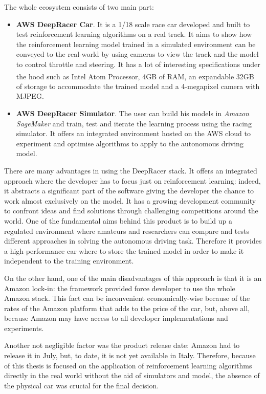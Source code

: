 The whole ecosystem consists of two main part:
\begin{itemize}
	\item \textbf{AWS DeepRacer Car}. It is a 1/18 scale race car developed and built to test reinforcement learning algorithms on a real track. It aims to show how the reinforcement learning model trained in a simulated environment can be conveyed to the real-world by using cameras to view the track and the model to control throttle and steering. It has a lot of interesting specifications under the hood such as Intel Atom \textsuperscript{\textregistered} Processor, 4GB of RAM, an expandable 32GB of storage to accommodate the trained model and a 4-megapixel camera with MJPEG.
	\item \textbf{AWS DeepRacer Simulator}. The user can build his models in \textit{Amazon SageMaker} and train, test and iterate the learning process using the racing simulator. It offers an integrated environment hosted on the AWS cloud to experiment and optimise algorithms to apply to the autonomous driving model.
\end{itemize}

There are many advantages in using the DeepRacer stack. It offers an integrated approach where the developer has to focus just on reinforcement learning: indeed, it abstracts a significant part of the software giving the developer the chance to work almost exclusively on the model. It has a growing development community to confront ideas and find solutions through challenging competitions around the world. One of the fundamental aims behind this product is to build up a regulated environment where amateurs and researchers can compare and tests different approaches in solving the autonomous driving task. Therefore it provides a high-performance car where to store the trained model in order to make it independent to the training environment.


On the other hand, one of the main disadvantages of this approach is that it is an Amazon lock-in: the framework provided force developer to use the whole Amazon stack. This fact can be inconvenient economically-wise because of the rates of the Amazon platform that adds to the price of the car, but, above all, because Amazon may have access to all developer implementations and experiments.

Another not negligible factor was the product release date: Amazon had to release it in July, but, to date, it is not yet available in Italy. Therefore, because of this thesis is focused on the application of reinforcement learning algorithms directly in the real world without the aid of simulators and model, the absence of the physical car was crucial for the final decision.


